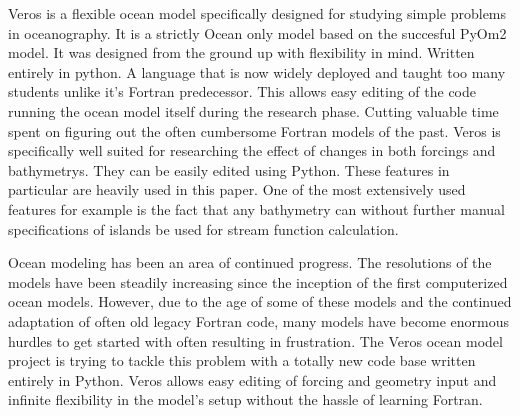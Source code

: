 Veros is a flexible ocean model specifically designed for studying simple problems in oceanography. It is a strictly Ocean only model based on the succesful PyOm2 model. It was designed from the ground up with flexibility in mind. Written entirely in python. A language that is now widely deployed and taught too many students unlike it's Fortran predecessor. This allows easy editing of the code running the ocean model itself during the research phase. Cutting valuable time spent on figuring out the often cumbersome Fortran models of the past. Veros is specifically well suited for researching the effect of changes in both forcings and bathymetrys. They can be easily edited using Python. These features in particular are heavily used in this paper. One of the most extensively used features for example is the fact that any bathymetry can without further manual specifications of islands be used for stream function calculation.



Ocean modeling has been an area of continued progress. The resolutions of the models have been steadily increasing since the inception of the first computerized ocean models. However, due to the age of some of these models and the continued adaptation of often old legacy Fortran code, many models have become enormous hurdles to get started with often resulting in frustration. The Veros\cite{Hafner2018Aug} ocean model project is trying to tackle this problem with a totally new code base written entirely in Python. Veros allows easy editing of forcing and geometry input and infinite flexibility in the model's setup without the hassle of learning Fortran.